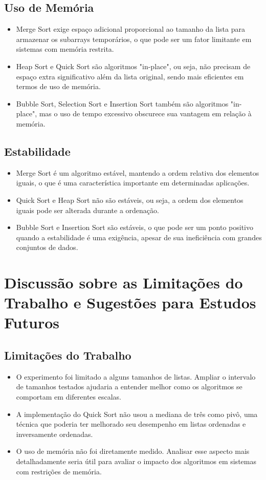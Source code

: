 \documentclass[12pt, a4paper]{report}
\begin{document}
\subsection{Uso de Memória}
\begin{itemize}
    \item Merge Sort exige espaço adicional proporcional ao tamanho da lista para armazenar os subarrays temporários, o que pode ser um fator limitante em sistemas com memória restrita.
    \item Heap Sort e Quick Sort são algoritmos "in-place", ou seja, não precisam de espaço extra significativo além da lista original, sendo mais eficientes em termos de uso de memória.
    \item Bubble Sort, Selection Sort e Insertion Sort também são algoritmos "in-place", mas o uso de tempo excessivo obscurece sua vantagem em relação à memória.
\end{itemize}

\subsection{Estabilidade}
\begin{itemize}
    \item Merge Sort é um algoritmo estável, mantendo a ordem relativa dos elementos iguais, o que é uma característica importante em determinadas aplicações.
    \item Quick Sort e Heap Sort não são estáveis, ou seja, a ordem dos elementos iguais pode ser alterada durante a ordenação.
    \item Bubble Sort e Insertion Sort são estáveis, o que pode ser um ponto positivo quando a estabilidade é uma exigência, apesar de sua ineficiência com grandes conjuntos de dados.
\end{itemize}

\section{Discussão sobre as Limitações do Trabalho e Sugestões para Estudos Futuros}

\subsection{Limitações do Trabalho}
\begin{itemize}
    \item O experimento foi limitado a alguns tamanhos de listas. Ampliar o intervalo de tamanhos testados ajudaria a entender melhor como os algoritmos se comportam em diferentes escalas.
    \item A implementação do Quick Sort não usou a mediana de três como pivô, uma técnica que poderia ter melhorado seu desempenho em listas ordenadas e inversamente ordenadas.
    \item O uso de memória não foi diretamente medido. Analisar esse aspecto mais detalhadamente seria útil para avaliar o impacto dos algoritmos em sistemas com restrições de memória.
\end{itemize}
\end{document}
